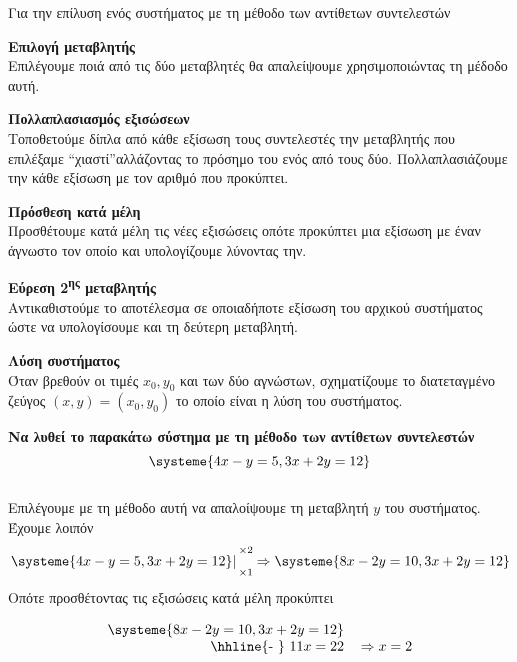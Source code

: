 \documentclass[twoside,nofonts,internet,methodoi]{thewria}
\newcommand{\synt}[2]{{\scriptsize \begin{matrix}
\times#1\\\\ \times#2
\end{matrix}}}
\newcommand{\tss}[1]{\textsuperscript{#1}}
\begin{document}
\begin{Methodos}
Για την επίλυση ενός συστήματος με τη μέθοδο των αντίθετων συντελεστών
\begin{bhma}
\item \textbf{Επιλογή μεταβλητής}\\
Επιλέγουμε ποιά από τις δύο μεταβλητές θα απαλείψουμε χρησιμοποιώντας τη μέδοδο αυτή.
\item \textbf{Πολλαπλασιασμός εξισώσεων}\\
Τοποθετούμε δίπλα από κάθε εξίσωση τους συντελεστές την μεταβλητής που επιλέξαμε \textquotedblleft χιαστί\textquotedblright\;αλλάζοντας το πρόσημο του ενός από τους δύο. Πολλαπλασιάζουμε την κάθε εξίσωση με τον αριθμό που προκύπτει.
\item \textbf{Πρόσθεση κατά μέλη}\\
Προσθέτουμε κατά μέλη τις νέες εξισώσεις οπότε προκύπτει μια εξίσωση με έναν άγνωστο τον οποίο και υπολογίζουμε λύνοντας την.
\item \textbf{Εύρεση 2\tss{ης} μεταβλητής}\\
Αντικαθιστούμε το αποτέλεσμα σε οποιαδήποτε εξίσωση του αρχικού συστήματος ώστε να υπολογίσουμε και τη δεύτερη μεταβλητή.
\item \textbf{Λύση συστήματος}\\
Όταν βρεθούν οι τιμές $ x_0,y_0 $ και των δύο αγνώστων, σχηματίζουμε το διατεταγμένο ζεύγος $ (x,y)=(x_0,y_0) $ το οποίο είναι η λύση του συστήματος.
\end{bhma}
\end{Methodos}
\textbf{Να λυθεί το παρακάτω σύστημα με τη μέθοδο των αντίθετων συντελεστών}
{\boldmath\[ \systeme{4x-y=5,3x+2y=12} \]}
\lysh\\
Επιλέγουμε με τη μέθοδο αυτή να απαλοίψουμε τη μεταβλητή $ y $ του συστήματος. Έχουμε λοιπόν
\[ \left. \systeme{4x-y=5,3x+2y=12}\right| \synt{2}{1}\Rightarrow\systeme{8x-2y=10,3x+2y=12} \]
Οπότε προσθέτοντας τις εξισώσεις κατά μέλη προκύπτει
\begin{center}
\vspace{-5mm}
\begin{equation}
\begin{tabular}{rr}
$ \displaystyle\systeme{8x-2y=10,3x+2y=12} $  &  \\ 
\hhline{-~} $ 11x=22 $ & $ \Rightarrow x=2  $
\end{tabular}
\end{equation}
\end{center}
\end{document}
